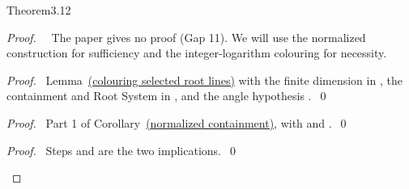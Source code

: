 \begin{mergedproofsection}
\begin{cgss}{Theorem}{3.12}\label{thm:3.12}
\end{cgss}
\begin{proof}
\pfsketch\ \repair\ The paper gives no proof (Gap 11).
We will use the normalized construction for sufficiency and the
integer-logarithm colouring for necessity.
\begin{proof}\pf\ Lemma~\hyperref[lem:312-necessary]{(colouring selected root lines)} with the finite
dimension in , the containment and Root System in ,
and the angle hypothesis .~\qed\end{proof}
\begin{proof}\pf\ Part 1 of Corollary~\hyperref[cor:312-containment]{(normalized containment)}, with
 and .~\qed\end{proof}
\qedstep
\begin{proof}\pf\ Steps  and
 are the two implications.~\qed\end{proof}
\end{proof}


\end{mergedproofsection}
